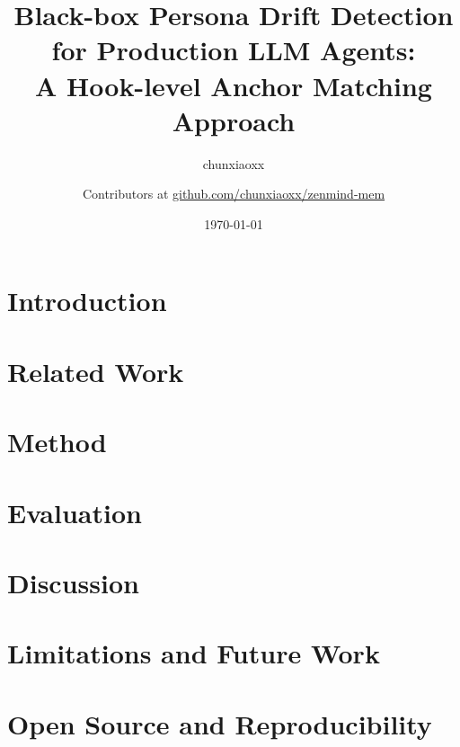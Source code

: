 \documentclass{article}
\title{Black-box Persona Drift Detection for Production LLM Agents:\\
       A Hook-level Anchor Matching Approach}
\author{chunxiaoxx \and Contributors at \url{github.com/chunxiaoxx/zenmind-mem}}
\date{\today}
\begin{document}
\maketitle

\begin{abstract}

\end{abstract}

\section{Introduction}


\section{Related Work}


\section{Method}


\section{Evaluation}


\section{Discussion}


\section{Limitations and Future Work}


\section{Open Source and Reproducibility}




\end{document}
